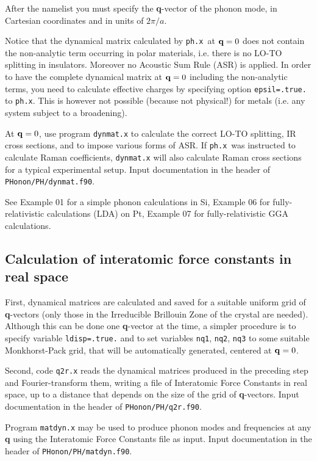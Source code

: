 \documentclass[12pt,a4paper]{article}
\def\phx{\texttt{ph.x}}
\begin{document}
After the namelist you must specify the {\bf q}-vector of the phonon mode,
in Cartesian coordinates and in units of $2\pi/a$.
    
Notice that the dynamical matrix calculated by \phx\ at ${\bf q}=0$ does not
contain the non-analytic term occurring in polar materials, i.e. there is no
LO-TO splitting in insulators. Moreover no Acoustic Sum Rule (ASR) is
applied. In order to have the complete dynamical matrix at ${\bf q}=0$ 
including the non-analytic terms, you need to calculate effective charges 
by specifying option \texttt{epsil=.true.} to \phx. This is however not 
possible (because not physical!) for metals (i.e. any system subject to 
a broadening).

At ${\bf q}=0$, use program \texttt{dynmat.x} to calculate the correct LO-TO 
splitting, IR cross sections, and to impose various forms of ASR. 
If \phx\ was instructed to calculate Raman coefficients, 
\texttt{dynmat.x} will also calculate Raman cross sections
for a typical experimental setup.
Input documentation in the header of \texttt{PHonon/PH/dynmat.f90}.

See Example 01 for a simple phonon calculations in Si, Example 06 for 
fully-relativistic calculations (LDA) on Pt, Example 07 for 
fully-relativistic GGA calculations.

\subsection{Calculation of interatomic force constants in real space}

First, dynamical matrices are calculated and saved for a suitable uniform 
grid of {\bf q}-vectors (only those in the Irreducible Brillouin Zone of the
crystal are needed). Although this can be done one {\bf q}-vector at the 
time, a
simpler procedure is to specify variable \texttt{ldisp=.true.} and to set 
variables \texttt{nq1}, \texttt{nq2}, \texttt{nq3} to some suitable 
Monkhorst-Pack grid, that will be automatically generated, centered at 
${\bf q}=0$. 
    
Second, code \texttt{q2r.x} reads the dynamical matrices produced in the
preceding step and Fourier-transform them, writing a file of Interatomic Force
Constants in real space, up to a distance that depends on the size of the grid
of {\bf q}-vectors. Input documentation in the header of \texttt{PHonon/PH/q2r.f90}.

Program \texttt{matdyn.x} may be used to produce phonon modes and
frequencies at any {\bf q} using the Interatomic Force Constants file as input.
Input documentation in the header of \texttt{PHonon/PH/matdyn.f90}.
\end{document}
